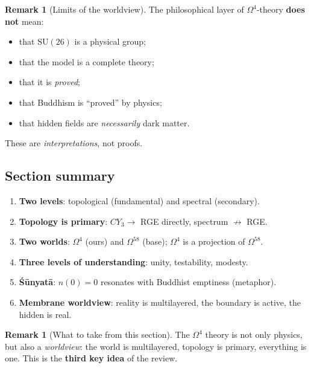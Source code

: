 \documentclass[11pt,a4paper]{article}
\newcommand{\SU}{\mathrm{SU}}
\newcommand{\CY}{CY_3}
\newcommand{\Om}{\Omega^4}
\newcommand{\Omfi}{\Omega^{58}}
\theoremstyle{definition}
\newtheorem{remark}[theorem]{Remark}
\begin{document}
\begin{remark}[Limits of the worldview]
\label{rem:worldview-limits}
The philosophical layer of $\Om$-theory \textbf{does not} mean:
\begin{itemize}
    \item that $\SU(26)$ is a physical group;
    \item that the model is a complete theory;
    \item that it is \emph{proved};
    \item that Buddhism is ``proved'' by physics;
    \item that hidden fields are \emph{necessarily} dark matter.
\end{itemize}
These are \emph{interpretations}, not proofs.
\end{remark}

\subsection{Section summary}
\label{subsec:philosophy-summary}

\begin{enumerate}
    \item \textbf{Two levels}: topological (fundamental) 
          and spectral (secondary).
    \item \textbf{Topology is primary}: $\CY \to$ RGE directly, 
          spectrum $\nrightarrow$ RGE.
    \item \textbf{Two worlds}: $\Om$ (ours) and $\Omfi$ (base); 
          $\Om$ is a projection of $\Omfi$.
    \item \textbf{Three levels of understanding}: unity, 
          testability, modesty.
    \item \textbf{Śūnyatā}: $n(0) = 0$ resonates with Buddhist 
          emptiness (metaphor).
    \item \textbf{Membrane worldview}: reality 
          is multilayered, the boundary is active, the hidden is real.
\end{enumerate}

\begin{remark}[What to take from this section]
\label{rem:philosophy-takeaway}
The $\Om$ theory is not only physics, but also a \emph{worldview}: 
the world is multilayered, topology is primary, everything is one. 
This is the \textbf{third key idea} of the review.
\end{remark}
\end{document}

